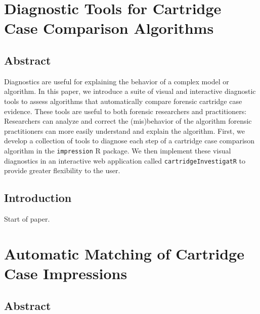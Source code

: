 \documentclass[11pt,]{isuthesis}
\begin{document}
\hypertarget{diagnostic-tools-for-cartridge-case-comparison-algorithms}{%
\chapter{Diagnostic Tools for Cartridge Case Comparison Algorithms}\label{diagnostic-tools-for-cartridge-case-comparison-algorithms}}

\hypertarget{abstract-1}{%
\section*{Abstract}\label{abstract-1}}

Diagnostics are useful for explaining the behavior of a complex model or algorithm.
In this paper, we introduce a suite of visual and interactive diagnostic tools to assess algorithms that automatically compare forensic cartridge case evidence.
These tools are useful to both forensic researchers and practitioners:
Researchers can analyze and correct the (mis)behavior of the algorithm forensic practitioners can more easily understand and explain the algorithm.
First, we develop a collection of tools to diagnose each step of a cartridge case comparison algorithm in the \texttt{impression} R package.
We then implement these visual diagnostics in an interactive web application called \texttt{cartridgeInvestigatR} to provide greater flexibility to the user.

\hypertarget{introduction}{%
\section{Introduction}\label{introduction}}

Start of paper.

\hypertarget{automatic-matching-of-cartridge-case-impressions}{%
\chapter{Automatic Matching of Cartridge Case Impressions}\label{automatic-matching-of-cartridge-case-impressions}}

\hypertarget{abstract-2}{%
\section*{Abstract}\label{abstract-2}}
\end{document}

